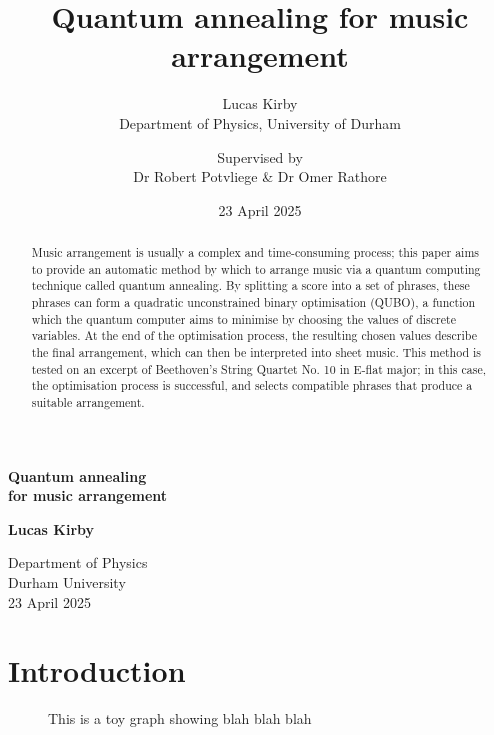 \documentclass[12pt]{article}
\title{\LARGE Quantum annealing for music arrangement}
\author{\Large Lucas Kirby\\\normalsize Department of Physics, University of Durham \and Supervised by\\\normalsize Dr Robert Potvliege \& Dr Omer Rathore}
\date{\normalsize 23 April 2025}
\begin{document}
\begin{titlepage}
\begin{center}
            
    \Huge
    \textbf{Quantum annealing\\for music arrangement}

    \large
    \textbf{Lucas Kirby}
        
    \vfill

    \begin{abstract}              

    Music arrangement is usually a complex and time-consuming process; this paper aims to provide an automatic method by which to arrange music via a quantum computing technique called quantum annealing. By splitting a score into a set of phrases, these phrases can form a quadratic unconstrained binary optimisation (QUBO), a function which the quantum computer aims to minimise by choosing the values of discrete variables. At the end of the optimisation process, the resulting chosen values describe the final arrangement, which can then be interpreted into sheet music. This method is tested on an excerpt of Beethoven's String Quartet No. 10 in E-flat major; in this case, the optimisation process is successful, and selects compatible phrases that produce a suitable arrangement. \cite{lucas_ising_2014}

    \end{abstract}

    \vfill

    

    \normalsize
    Department of Physics\\
    Durham University\\
    23 April 2025
            
\end{center}
\end{titlepage}


\tableofcontents
\listoffigures
\listoftables

\thispagestyle{empty}
\clearpage

\section{Introduction}

\begin{figure}
    \small
    
    \caption[Toy graph]{This is a toy graph showing blah blah blah}
\end{figure}
\end{document}
